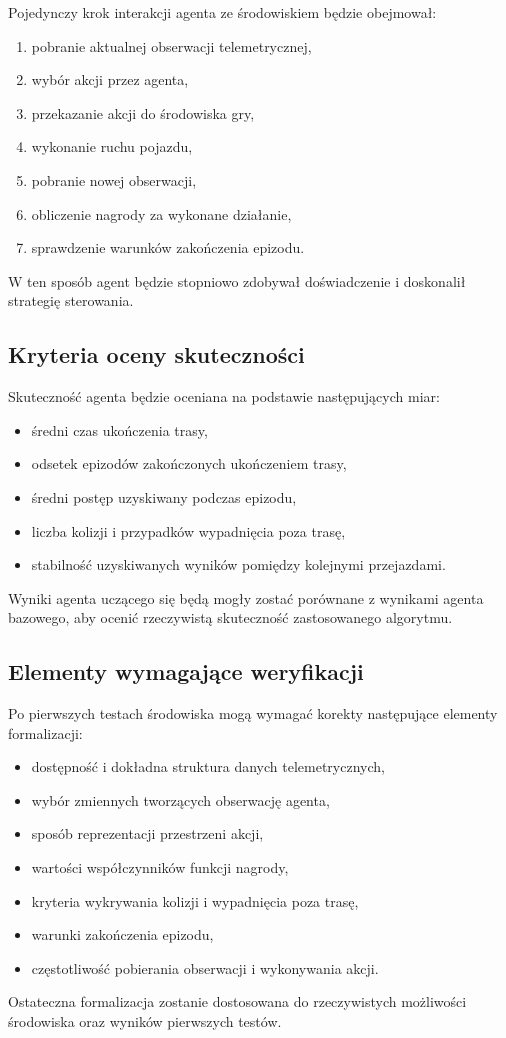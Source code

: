 \documentclass[12pt]{article}
\begin{document}
Pojedynczy krok interakcji agenta ze środowiskiem będzie obejmował:
\begin{enumerate}
    \item pobranie aktualnej obserwacji telemetrycznej,
    \item wybór akcji przez agenta,
    \item przekazanie akcji do środowiska gry,
    \item wykonanie ruchu pojazdu,
    \item pobranie nowej obserwacji,
    \item obliczenie nagrody za wykonane działanie,
    \item sprawdzenie warunków zakończenia epizodu.
\end{enumerate}

W ten sposób agent będzie stopniowo zdobywał doświadczenie i doskonalił strategię sterowania.

\subsection{Kryteria oceny skuteczności}

Skuteczność agenta będzie oceniana na podstawie następujących miar:
\begin{itemize}
    \item średni czas ukończenia trasy,
    \item odsetek epizodów zakończonych ukończeniem trasy,
    \item średni postęp uzyskiwany podczas epizodu,
    \item liczba kolizji i przypadków wypadnięcia poza trasę,
    \item stabilność uzyskiwanych wyników pomiędzy kolejnymi przejazdami.
\end{itemize}

Wyniki agenta uczącego się będą mogły zostać porównane z wynikami agenta bazowego, aby ocenić rzeczywistą skuteczność zastosowanego algorytmu.

\subsection{Elementy wymagające weryfikacji}

Po pierwszych testach środowiska mogą wymagać korekty następujące elementy formalizacji:
\begin{itemize}
    \item dostępność i dokładna struktura danych telemetrycznych,
    \item wybór zmiennych tworzących obserwację agenta,
    \item sposób reprezentacji przestrzeni akcji,
    \item wartości współczynników funkcji nagrody,
    \item kryteria wykrywania kolizji i wypadnięcia poza trasę,
    \item warunki zakończenia epizodu,
    \item częstotliwość pobierania obserwacji i wykonywania akcji.
\end{itemize}

Ostateczna formalizacja zostanie dostosowana do rzeczywistych możliwości środowiska oraz wyników pierwszych testów.
\end{document}
